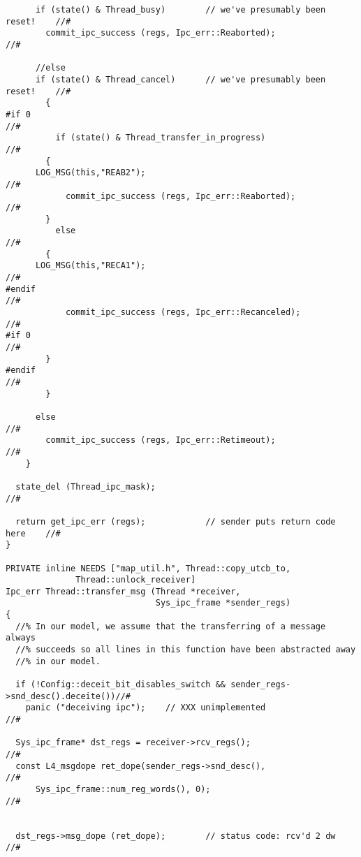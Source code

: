 \begin{lstlisting}
      if (state() & Thread_busy)        // we've presumably been reset!    //#
        commit_ipc_success (regs, Ipc_err::Reaborted);                     //#

      //else 
      if (state() & Thread_cancel)      // we've presumably been reset!    //#
        {
#if 0                                                                      //#
          if (state() & Thread_transfer_in_progress)                       //#
	    {
	  LOG_MSG(this,"REAB2");                                           //# 
            commit_ipc_success (regs, Ipc_err::Reaborted);                 //#
	    }
          else                                                             //#
	    {
	  LOG_MSG(this,"RECA1");                                           //#
#endif                                                                     //# 
            commit_ipc_success (regs, Ipc_err::Recanceled);                //#
#if 0                                                                      //#
	    }
#endif                                                                     //#
        }

      else                                                                 //#
        commit_ipc_success (regs, Ipc_err::Retimeout);                     //#
    }

  state_del (Thread_ipc_mask);                                             //#

  return get_ipc_err (regs);            // sender puts return code here    //#
}

PRIVATE inline NEEDS ["map_util.h", Thread::copy_utcb_to, 
		      Thread::unlock_receiver]
Ipc_err Thread::transfer_msg (Thread *receiver,
                              Sys_ipc_frame *sender_regs)
{
  //% In our model, we assume that the transferring of a message always 
  //% succeeds so all lines in this function have been abstracted away
  //% in our model.
  
  if (!Config::deceit_bit_disables_switch && sender_regs->snd_desc().deceite())//#
    panic ("deceiving ipc");    // XXX unimplemented                       //#

  Sys_ipc_frame* dst_regs = receiver->rcv_regs();                          //#
  const L4_msgdope ret_dope(sender_regs->snd_desc(),                       //#
      Sys_ipc_frame::num_reg_words(), 0);                                  //#


  dst_regs->msg_dope (ret_dope);        // status code: rcv'd 2 dw         //#


\end{lstlisting}
